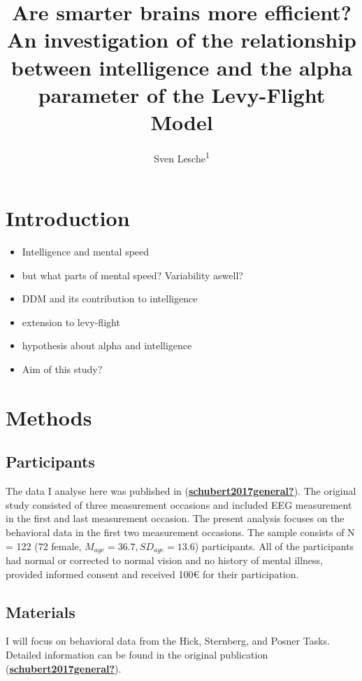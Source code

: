 \documentclass[
  man,floatsintext]{apa7}
\title{Are smarter brains more efficient? An investigation of the relationship between intelligence and the alpha parameter of the Levy-Flight Model}
\author{Sven Lesche\textsuperscript{1}}
\date{}
\affiliation{\vspace{0.5cm}\textsuperscript{1} Ruprecht-Karls-University Heidelberg}
\begin{document}
\maketitle

\hypertarget{introduction}{%
\section{Introduction}\label{introduction}}

\begin{itemize}
\item
  Intelligence and mental speed
\item
  but what parts of mental speed? Variability aswell?
\item
  DDM and its contribution to intelligence
\item
  extension to levy-flight
\item
  hypothesis about alpha and intelligence
\item
  Aim of this study?
\end{itemize}

\hypertarget{methods}{%
\section{Methods}\label{methods}}

\hypertarget{participants}{%
\subsection{Participants}\label{participants}}

The data I analyse here was published in (\protect\hyperlink{ref-schubert2017general}{\textbf{schubert2017general?}}). The original study consisted of three measurement occasions and included EEG measurement in the first and last measurement occasion. The present analysis focuses on the behavioral data in the first two measurement occasions. The sample consists of N = 122 (72 female, \(M_{age} = 36.7, SD_{age} = 13.6\)) participants. All of the participants had normal or corrected to normal vision and no history of mental illness, provided informed consent and received 100€ for their participation.

\hypertarget{materials}{%
\subsection{Materials}\label{materials}}

I will focus on behavioral data from the Hick, Sternberg, and Posner Tasks. Detailed information can be found in the original publication (\protect\hyperlink{ref-schubert2017general}{\textbf{schubert2017general?}}).
\end{document}
